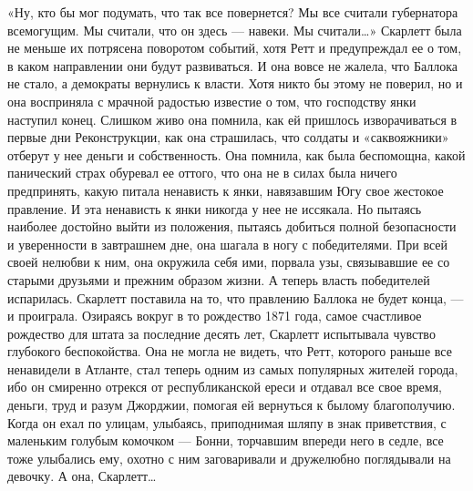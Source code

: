 «Ну, кто бы мог подумать, что так все повернется? Мы все считали губернатора всемогущим. Мы считали, что он здесь — навеки. Мы считали…» Скарлетт была не меньше их потрясена поворотом событий, хотя Ретт и предупреждал ее о том, в каком направлении они будут развиваться. И она вовсе не жалела, что Баллока не стало, а демократы вернулись к власти. Хотя никто бы этому не поверил, но и она восприняла с мрачной радостью известие о том, что господству янки наступил конец. Слишком живо она помнила, как ей пришлось изворачиваться в первые дни Реконструкции, как она страшилась, что солдаты и «саквояжники» отберут у нее деньги и собственность. Она помнила, как была беспомощна, какой панический страх обуревал ее оттого, что она не в силах была ничего предпринять, какую питала ненависть к янки, навязавшим Югу свое жестокое правление. И эта ненависть к янки никогда у нее не иссякала. Но пытаясь наиболее достойно выйти из положения, пытаясь добиться полной безопасности и уверенности в завтрашнем дне, она шагала в ногу с победителями. При всей своей нелюбви к ним, она окружила себя ими, порвала узы, связывавшие ее со старыми друзьями и прежним образом жизни. А теперь власть победителей испарилась. Скарлетт поставила на то, что правлению Баллока не будет конца, — и проиграла.
Озираясь вокруг в то рождество 1871 года, самое счастливое рождество для штата за последние десять лет, Скарлетт испытывала чувство глубокого беспокойства. Она не могла не видеть, что Ретт, которого раньше все ненавидели в Атланте, стал теперь одним из самых популярных жителей города, ибо он смиренно отрекся от республиканской ереси и отдавал все свое время, деньги, труд и разум Джорджии, помогая ей вернуться к былому благополучию. Когда он ехал по улицам, улыбаясь, приподнимая шляпу в знак приветствия, с маленьким голубым комочком — Бонни, торчавшим впереди него в седле, все тоже улыбались ему, охотно с ним заговаривали и дружелюбно поглядывали на девочку. А она, Скарлетт…

